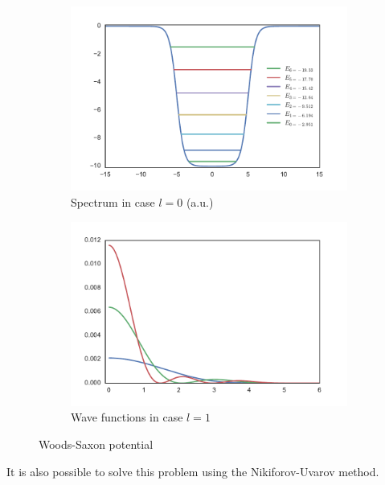 \documentclass[a4paper, 14pt]{article}
\begin{document}
\begin{figure}[h!] 
\centering
\begin{subfigure}{.5\textwidth}
  \centering
  \includegraphics[width=1.0\linewidth]{WS_poten.pdf}
  \caption{Spectrum in case $l=0$ (a.u.)}
\end{subfigure}%
\begin{subfigure}{.5\textwidth}
  \centering
  \includegraphics[width=1.0\linewidth]{WS_wave.pdf}
  \caption{Wave functions in case $l=1$}
\end{subfigure}
\caption{Woods-Saxon potential}
\label{fig:WS_potential}
\end{figure}
It is also possible  to solve this problem using  the Nikiforov-Uvarov method. 
\end{document}
